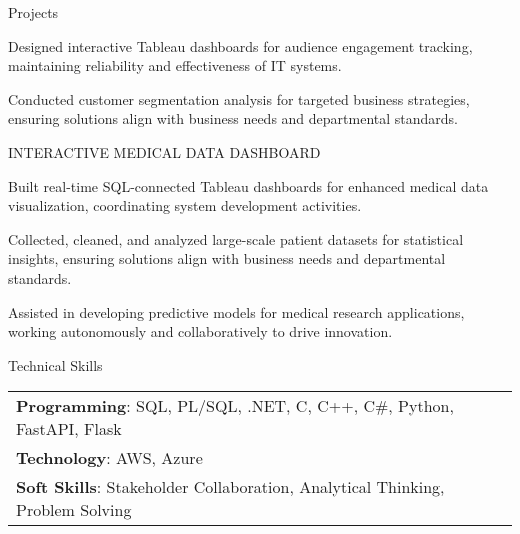 \documentclass{resume} %
\begin{document}
\begin{rSection}{Projects}
\begin{rSubsection}
                                    \item Designed interactive Tableau dashboards for audience engagement tracking, maintaining reliability and effectiveness of IT systems.
                                    \item Conducted customer segmentation analysis for targeted business strategies, ensuring solutions align with business needs and departmental standards.
                            \end{rSubsection}
                    \begin{rSubsection}
                                    {INTERACTIVE MEDICAL DATA DASHBOARD}
                                {}{}{}
                                    \item Built real{-}time SQL{-}connected Tableau dashboards for enhanced medical data visualization, coordinating system development activities.
                                    \item Collected, cleaned, and analyzed large{-}scale patient datasets for statistical insights, ensuring solutions align with business needs and departmental standards.
                                    \item Assisted in developing predictive models for medical research applications, working autonomously and collaboratively to drive innovation.
                            \end{rSubsection}
            \end{rSection}

    \begin{rSection}{Technical Skills}
        \begin{tabular}{ @{} l @{	} l }
                                \textbf{Programming}: SQL, PL/SQL, .NET, C, C++, C\#, Python, FastAPI, Flask\\
                                \textbf{Technology}: AWS, Azure\\
                                \textbf{Soft Skills}: Stakeholder Collaboration, Analytical Thinking, Problem Solving\\
        \end{tabular}
    \end{rSection}
\end{document}
